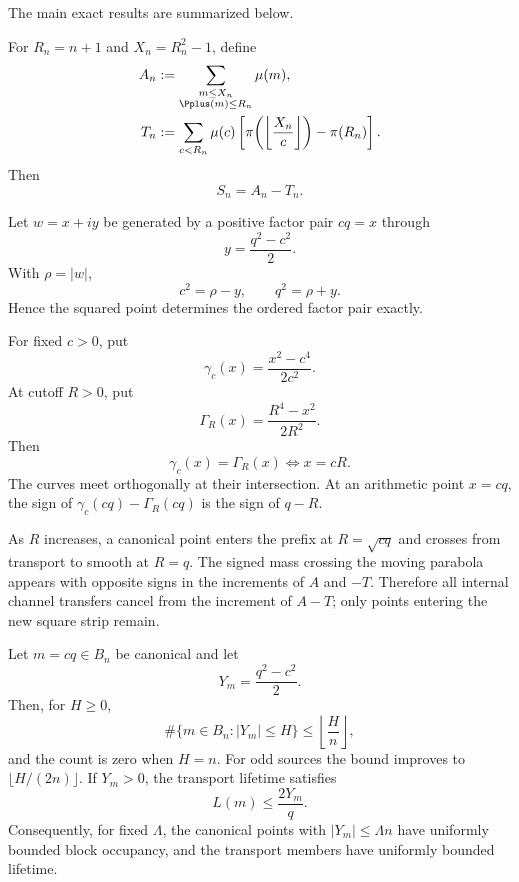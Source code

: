 The main exact results are summarized below.

\begin{theorem}
\label{thm:intro-decomposition}
For $R_n=n+1$ and $X_n=R_n^2-1$, define
\begin{align*}
 A_n&:=\sum_{\substack{m\le X_n\\\Pplus(m)\le R_n}}\mu(m),\\
 T_n&:=\sum_{c<R_n}\mu(c)
 \left[
 \pi\!\left(\left\lfloor\frac{X_n}{c}\right\rfloor\right)-\pi(R_n)
 \right].
\end{align*}
Then
\[
 \boxed{S_n=A_n-T_n.}
\]
\end{theorem}

\begin{theorem}
\label{thm:intro-recovery}
Let $w=x+iy$ be generated by a positive factor pair $cq=x$ through
\[
 y=\frac{q^2-c^2}{2}.
\]
With $\rho=|w|$,
\[
 \boxed{c^2=\rho-y,\qquad q^2=\rho+y.}
\]
Hence the squared point determines the ordered factor pair exactly.
\end{theorem}

\begin{theorem}
\label{thm:intro-intersection}
For fixed $c>0$, put
\[
 \gamma_c(x)=\frac{x^2-c^4}{2c^2}.
\]
At cutoff $R>0$, put
\[
 \Gamma_R(x)=\frac{R^4-x^2}{2R^2}.
\]
Then
\[
 \boxed{\gamma_c(x)=\Gamma_R(x)\iff x=cR.}
\]
The curves meet orthogonally at their intersection.  At an arithmetic point $x=cq$, the sign of $\gamma_c(cq)-\Gamma_R(cq)$ is the sign of $q-R$.
\end{theorem}

\begin{theorem}
\label{thm:intro-telescoping}
As $R$ increases, a canonical point enters the prefix at $R=\sqrt{cq}$ and crosses from transport to smooth at $R=q$.  The signed mass crossing the moving parabola appears with opposite signs in the increments of $A$ and $-T$.  Therefore all internal channel transfers cancel from the increment of $A-T$; only points entering the new square strip remain.
\end{theorem}

\begin{theorem}
\label{thm:intro-low}
Let $m=cq\in B_n$ be canonical and let
\[
 Y_m=\frac{q^2-c^2}{2}.
\]
Then, for $H\ge0$,
\[
 \#\{m\in B_n:|Y_m|\le H\}
 \le\left\lfloor\frac{H}{n}\right\rfloor,
\]
and the count is zero when $H=n$.  For odd sources the bound improves to
$\lfloor H/(2n)\rfloor$.
If $Y_m>0$, the transport lifetime satisfies
\[
 L(m)\le\frac{2Y_m}{q}.
\]
Consequently, for fixed $\Lambda$, the canonical points with $|Y_m|\le\Lambda n$ have uniformly bounded block occupancy, and the transport members have uniformly bounded lifetime.
\end{theorem}

